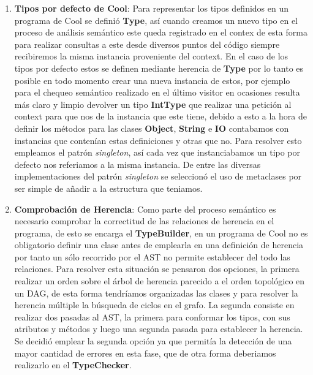 \documentclass{article}
\begin{document}
\begin{enumerate}
	\item[] \textbf{Tipos por defecto de Cool}: Para representar los tipos definidos en un programa de Cool se defini\'o \textbf{Type}, as\'i cuando creamos un nuevo tipo en el proceso de an\'alisis sem\'antico este queda registrado en el contex de esta forma para realizar consultas a este desde diversos puntos del c\'odigo siempre recibiremos la misma instancia proveniente del context. En el caso de los tipos por defecto estos se definen mediante herencia de \textbf{Type} por lo tanto es posible en todo momento crear una nueva instancia de estos, por ejemplo para el chequeo sem\'antico realizado en el \'ultimo visitor en ocasiones resulta m\'as claro y limpio devolver un tipo \textbf{IntType} que realizar una petici\'on al context para que nos de la instancia que este tiene, debido a esto a la hora de definir los m\'etodos para las clases \textbf{Object}, \textbf{String} e \textbf{IO} contabamos con instancias que conten\'ian estas definiciones y otras que no. Para resolver esto empleamos el patr\'on \textit{singleton}, as\'i cada vez que instanciabamos un tipo por defecto nos referiamos a la misma instancia. De entre las diversas implementaciones del patr\'on \textit{singleton} se seleccion\'o el uso de metaclases por ser simple de a\~nadir a la estructura que teniamos.
	
	\item[] \textbf{Comprobaci\'on de Herencia}: Como parte del proceso sem\'antico es necesario comprobar la correctitud de las relaciones de herencia en el programa, de esto se encarga el \textbf{TypeBuilder}, en un programa de Cool no es obligatorio definir una clase antes de emplearla en una definici\'on de herencia por tanto un s\'olo recorrido por el AST no permite establecer del todo las relaciones. Para resolver esta situaci\'on se pensaron dos opciones, la primera realizar un orden sobre el \'arbol de herencia parecido a el orden topol\'ogico en un DAG, de esta forma tendr\'iamos organizadas las clases y para resolver la herencia m\'ultiple la b\'usqueda de ciclos en el grafo. La segunda consiste en realizar dos pasadas al AST, la primera para conformar los tipos, con sus atributos y m\'etodos y luego una segunda pasada para establecer la herencia. Se decidi\'o emplear la segunda opci\'on ya que permit\'ia la detecci\'on de una mayor cantidad de errores en esta fase, que de otra forma deberiamos realizarlo en el \textbf{TypeChecker}. 
	
\end{enumerate}
\end{document}
